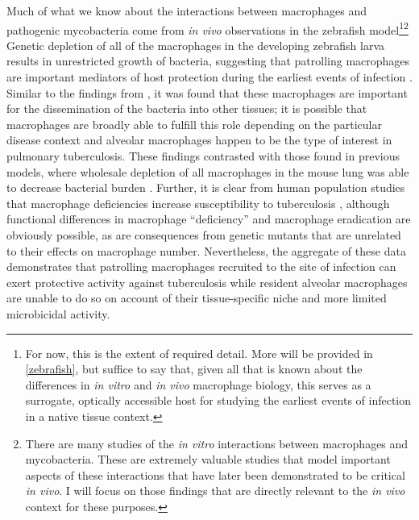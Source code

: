 Much of what we know about the interactions between macrophages and pathogenic mycobacteria come from \textit{in vivo} observations in the zebrafish model\footnote{For now, this is the extent of required detail. More will be provided in \autoref{zebrafish}, but suffice to say that, given all that is known about the differences in \textit{in vitro} and \textit{in vivo} macrophage biology, this serves as a surrogate, optically accessible host for studying the earliest events of infection in a native tissue context.}\footnote{There are many studies of the \textit{in vitro} interactions between macrophages and mycobacteria. These are extremely valuable studies that model important aspects of these interactions that have later been demonstrated to be critical \textit{in vivo}. I will focus on those findings that are directly relevant to the \textit{in vivo} context for these purposes.} Genetic depletion of all of the macrophages in the developing zebrafish larva results in unrestricted growth of bacteria, suggesting that patrolling macrophages are important mediators of host protection during the earliest events of infection \citep{Clay2007}. Similar to the findings from \citeauthor{Cohen2018}, it was found that these macrophages are important for the dissemination of the bacteria into other tissues; it is possible that macrophages are broadly able to fulfill this role depending on the particular disease context and alveolar macrophages happen to be the type of interest in pulmonary tuberculosis. These findings contrasted with those found in previous models, where wholesale depletion of all macrophages in the mouse lung was able to decrease bacterial burden \citep{Leemans2005}. Further, it is clear from human population studies that macrophage deficiencies increase susceptibility to tuberculosis \citep{Hambleton2011}, although functional differences in macrophage ``deficiency'' and macrophage eradication are obviously possible, as are consequences from genetic mutants that are unrelated to their effects on macrophage number. Nevertheless, the aggregate of these data demonstrates that patrolling macrophages recruited to the site of infection can exert protective activity against tuberculosis while resident alveolar macrophages are unable to do so on account of their tissue\hyp{}specific niche and more limited microbicidal activity.

